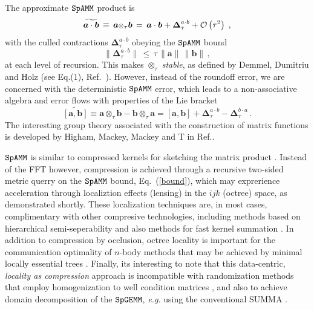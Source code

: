 \documentclass[letterpaper,twocolumn,amsmath,amsfont,amssymb,english,aps,jcp,preprintnumbers,groupaddress,nofootinbib,tightenlines]{revtex4}
\newcommand{\mat}[1]{\boldsymbol{#1}}
\newcommand{\ot}{ {\scriptstyle \otimes}_{ \tau } }
\begin{document}
The approximate $\tt SpAMM$ product is 
\begin{equation}
\widetilde{\mat{a}\cdot \mat{b}} \,  \equiv \, \mat{a} \ot \mat{b} \, 
  = \, \mat{a} \cdot \mat{b} + \mat{\Delta}^{a \cdot b}_{\tau} 
+ {\cal{O}} \left(  \tau^2 \right) \; ,
\end{equation}
with the culled contractions $\mat{\Delta}^{a \cdot b}_{\tau}$ obeying the $\tt SpAMM$ bound 
\begin{equation}\label{bound}
\lVert \mat{\Delta}^{a \cdot b}_{\tau} \rVert \, \leq \, \tau \, \lVert \mat{a} \rVert  \,  \lVert \mat{b} \rVert \, , 
\end{equation}
at each level of recursion.  This makes $\ot$ {\em stable}, as defined by Demmel, Dumitriu and Holz (see Eq.(1), Ref.~\cite{Demmel07}). 
However, instead of the roundoff error, we are concerned with the deterministic $\tt SpAMM$ error,  which 
leads to a non-associative algebra and error flows with properties of the Lie bracket
\begin{equation}
\widetilde{\left[ \mat{a} , \mat{b} \right]} \equiv \mat{a} \ot \mat{b}-\mat{b} \ot \mat{a}  
=  \left[ \mat{a} , \mat{b} \right]
+ \mat{\Delta}^{a\cdot b}_{\tau} -\mat{\Delta}^{b\cdot a}_{\tau} \,.
\end{equation}
The interesting group theory associated with the construction of matrix functions is developed by Higham, Mackey, Mackey and T 
in Ref.\cite{}.  

$\tt SpAMM$ is similar to compressed kernels for sketching the matrix product \cite{Kutzkov2012, Pagh2013}.  Instead of
the FFT however, compression is achieved through a recursive two-sided metric querry on the $\tt SpAMM$ bound, Eq.~(\ref{bound}),
which may exprerience acceleration through localiztion effects (lensing) in the $ijk$ (octree) space, as demonstrated shortly. 
These localization techniques are, in most cases, complimentary with other compresive technologies, including methods based on 
hierarchical semi-seperability and also methods for fast kernel summation \cite{}. 
In addition to compression by occlusion, octree locality is important for the communication optimality of 
$n$-body methods \cite{Warren Salmon, Yellik} that may be achieved by minimal locally essential trees \cite{}.    
Finally, its interesting to note that this data-centric, {\em locality as compression} approach is incompatible with 
randomization methods that employ homogenization to well condition matrices 
\cite{pan, DiahLi and Parket Scott},  and also to achieve domain decomposition of the $\tt SpGEMM$, {\em e.g.} 
using the conventional SUMMA \cite{}.
\end{document}
